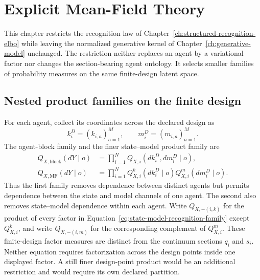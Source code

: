 \chapter{Explicit Mean-Field Theory}
\label{ch:mean-field-theory}

This chapter restricts the recognition law of Chapter~\ref{ch:structured-recognition-elbo} while leaving the normalized generative kernel of Chapter~\ref{ch:generative-model} unchanged. The restriction neither replaces an agent by a variational factor nor changes the section-bearing agent ontology. It selects smaller families of probability measures on the same finite-design latent space.

\section{Nested product families on the finite design}

For each agent, collect its coordinates across the declared design as
\begin{equation}
k_i^D=(k_{i,a})_{a=1}^{M},
\qquad
m_i^D=(m_{i,a})_{a=1}^{M}.
\label{eq:mean-field-design-blocks}
\end{equation}
The agent-block family and the finer state--model product family are
\begin{align}
Q_{X,\mathrm{block}}(dY\mid o)
&=\prod_{i=1}^{N}Q_{X,i}(dk_i^D,dm_i^D\mid o),
\label{eq:agent-block-recognition-family}\\
Q_{X,\mathrm{MF}}(dY\mid o)
&=\prod_{i=1}^{N}Q^k_{X,i}(dk_i^D\mid o)Q^m_{X,i}(dm_i^D\mid o).
\label{eq:state-model-recognition-family}
\end{align}
Thus the first family removes dependence between distinct agents but permits dependence between the state and model channels of one agent. The second also removes state--model dependence within each agent. Write \(Q_{X,-(i,k)}\) for the product of every factor in Equation~\eqref{eq:state-model-recognition-family} except \(Q^k_{X,i}\), and write \(Q_{X,-(i,m)}\) for the corresponding complement of \(Q^m_{X,i}\). These finite-design factor measures are distinct from the continuum sections \(q_i\) and \(s_i\). Neither equation requires factorization across the design points inside one displayed factor. A still finer design-point product would be an additional restriction and would require its own declared partition.

